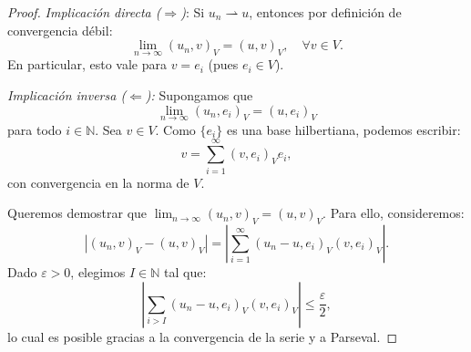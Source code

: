 \documentclass[12pt]{book}
\theoremstyle{definition}
\theoremstyle{plain}
\theoremstyle{remark}
\begin{document}
\begin{proof}
\emph{Implicación directa (\(\Rightarrow\))}:
  Si \(u_n \rightharpoonup u\), entonces por definición de convergencia débil:
  \[
  \lim_{n \to \infty} ( u_n, v )_V = ( u, v )_V, \quad \forall v \in V.
  \]
  En particular, esto vale para \(v = e_i\) (pues \(e_i \in V\)).

\medskip

\noindent \emph{Implicación inversa (\(\Leftarrow\)):}
  Supongamos que \[\lim_{n \to \infty} ( u_n, e_i )_V = ( u, e_i )_V\] para todo \(i \in \mathbb{N}\). Sea \(v \in V\). Como \(\{e_i\}\) es una base hilbertiana, podemos escribir:
  \[
  v = \sum_{i=1}^\infty ( v, e_i )_V e_i,
  \]
  con convergencia en la norma de \(V\).
%


Queremos demostrar que \(\lim_{n \to \infty} (u_n, v)_V = (u, v)_V\). Para ello, consideremos:
\[
|(u_n, v)_V - (u, v)_V| = \left| \sum_{i=1}^\infty (u_n - u, e_i)_V (v, e_i)_V \right|.
\]
%
Dado \(\varepsilon > 0\), elegimos \(I \in \mathbb{N}\) tal que:
\[
\left| \sum_{i > I} (u_n - u, e_i)_V (v, e_i)_V \right| \leq \frac{\varepsilon}{2},
\]
lo cual es posible gracias a la convergencia de la serie y a  Parseval.


\end{proof}
\end{document}
